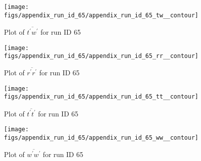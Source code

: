 \begin{figure}[H]
\centering
\texttt{[image: figs/appendix\_run\_id\_65/appendix\_run\_id\_65\_tw\_\_contour]}
\caption{Plot of $\overline{t^\prime w^\prime}$ for run ID 65}
\label{fig:appendix_run_id_65_tw__contour}
\end{figure}


\begin{figure}[H]
\centering
\texttt{[image: figs/appendix\_run\_id\_65/appendix\_run\_id\_65\_rr\_\_contour]}
\caption{Plot of $\overline{r^\prime r^\prime}$ for run ID 65}
\label{fig:appendix_run_id_65_rr__contour}
\end{figure}


\begin{figure}[H]
\centering
\texttt{[image: figs/appendix\_run\_id\_65/appendix\_run\_id\_65\_tt\_\_contour]}
\caption{Plot of $\overline{t^\prime t^\prime}$ for run ID 65}
\label{fig:appendix_run_id_65_tt__contour}
\end{figure}


\begin{figure}[H]
\centering
\texttt{[image: figs/appendix\_run\_id\_65/appendix\_run\_id\_65\_ww\_\_contour]}
\caption{Plot of $\overline{w^\prime w^\prime}$ for run ID 65}
\label{fig:appendix_run_id_65_ww__contour}
\end{figure}


